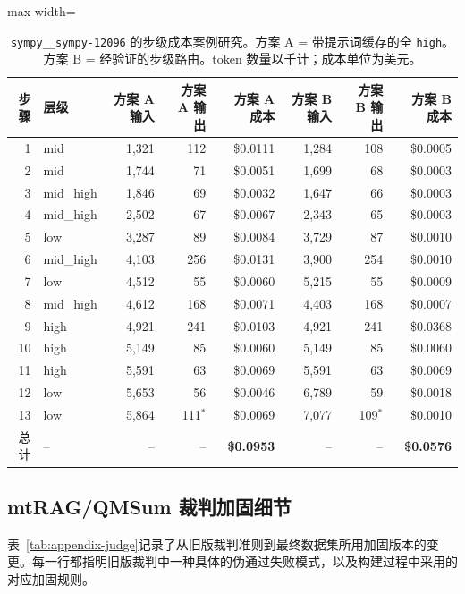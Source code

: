 \begin{table}[ht]
\centering
\scriptsize
\caption{\texttt{sympy\_\_sympy-12096} 的步级成本案例研究。方案 A = 带提示词缓存的全 \texttt{high}。方案 B = 经验证的步级路由。token 数量以千计；成本单位为美元。}
\label{tab:appendix-sympy}
\begin{adjustbox}{max width=\linewidth}
\begin{tabular}{r l r r r r r r}
\toprule
步骤 & 层级 & 方案 A 输入 & 方案 A 输出 & 方案 A 成本 & 方案 B 输入 & 方案 B 输出 & 方案 B 成本 \\
\midrule
 1 & mid      & 1,321 & 112 & \$0.0111 & 1,284 & 108 & \$0.0005 \\
 2 & mid      & 1,744 &  71 & \$0.0051 & 1,699 &  68 & \$0.0003 \\
 3 & mid\_high & 1,846 &  69 & \$0.0032 & 1,647 &  66 & \$0.0003 \\
 4 & mid\_high & 2,502 &  67 & \$0.0067 & 2,343 &  65 & \$0.0003 \\
 5 & low      & 3,287 &  89 & \$0.0084 & 3,729 &  87 & \$0.0010 \\
 6 & mid\_high & 4,103 & 256 & \$0.0131 & 3,900 & 254 & \$0.0010 \\
 7 & low      & 4,512 &  55 & \$0.0060 & 5,215 &  55 & \$0.0009 \\
 8 & mid\_high & 4,612 & 168 & \$0.0071 & 4,403 & 168 & \$0.0007 \\
 9 & high     & 4,921 & 241 & \$0.0103 & 4,921 & 241 & \$0.0368 \\
10 & high     & 5,149 &  85 & \$0.0060 & 5,149 &  85 & \$0.0060 \\
11 & high     & 5,591 &  63 & \$0.0069 & 5,591 &  63 & \$0.0069 \\
12 & low      & 5,653 &  56 & \$0.0046 & 6,789 &  59 & \$0.0018 \\
13 & low      & 5,864 & 111$^{*}$ & \$0.0069 & 7,077 & 109$^{*}$ & \$0.0010 \\
\midrule
总计 & -- & -- & -- & \textbf{\$0.0953} & -- & -- & \textbf{\$0.0576} \\
\bottomrule
\end{tabular}
\end{adjustbox}
\end{table}

\subsection{mtRAG/QMSum 裁判加固细节}
\label{app:judge}

表~\ref{tab:appendix-judge}记录了从旧版裁判准则到最终数据集所用加固版本的变更。每一行都指明旧版裁判中一种具体的伪通过失败模式，以及构建过程中采用的对应加固规则。

